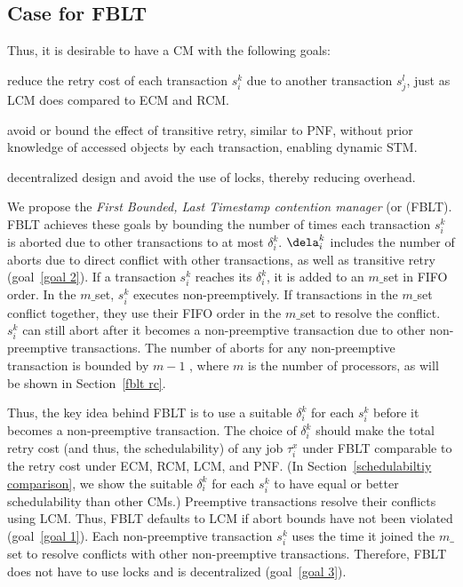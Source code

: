 \documentclass[prodmode,acmtecs]{acmsmall}
\begin{document}
\subsection{Case for FBLT}

Thus, it is desirable to have a CM with the following goals:
\begin{compactenum}
\item \label{goal 1} reduce the retry cost of each transaction $s_i^k$ due to another transaction $s_j^l$, just as LCM does compared to ECM and RCM.
\item \label{goal 2} avoid or bound the effect of transitive retry, similar to PNF, without prior knowledge of accessed objects by each transaction, enabling dynamic STM.
\item \label{goal 3} decentralized design and avoid the use of locks, thereby reducing  overhead.
\end{compactenum}

We propose the \textit{First Bounded, Last Timestamp contention manager} (or (FBLT). FBLT achieves these goals by bounding the number of times each transaction $s_i^k$ is aborted due to other transactions to at most $\delta_i^k$. $\dela_i^k$ includes the number of aborts due to direct conflict with other transactions, as well as transitive retry (goal~\ref{goal 2}). If a transaction $s_i^k$ reaches its $\delta_i^k$, it is added to an $m\_$set in FIFO order. In the $m\_$set, $s_i^k$ executes non-preemptively. If transactions in the $m\_$set conflict together, they use their FIFO order in the $m\_$set to resolve the conflict. $s_i^k$ can still abort after it becomes a non-preemptive transaction due to other non-preemptive transactions. The number of aborts for any non-preemptive transaction is bounded by $m-1$ , where $m$ is the number of processors, as will be shown in Section~\ref{fblt rc}. 

Thus, the key idea behind FBLT is to use a suitable $\delta_i^k$ for each $s_i^k$ before it becomes a non-preemptive transaction. The choice of $\delta_i^k$ should make the total retry cost (and thus, the schedulability) of any job $\tau_i^x$ under FBLT comparable to the retry cost under ECM, RCM, LCM, and PNF. (In Section~\ref{schedulabiltiy comparison}, we show the suitable $\delta_i^k$ for each $s_i^k$ to have equal or better schedulability than other CMs.) Preemptive transactions resolve their conflicts using LCM.  Thus, FBLT defaults to LCM if abort bounds have not been violated (goal~\ref{goal 1}). Each non-preemptive transaction $s_i^k$  uses the time it joined the $m\_$set to resolve conflicts with other non-preemptive transactions. Therefore, FBLT does not have to use locks and is decentralized (goal~\ref{goal 3}).
\end{document}
